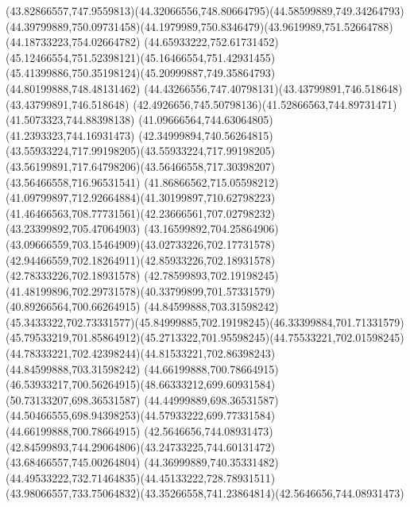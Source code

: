 {{\curveto(43.82866557,747.9559813)(44.32066556,748.80664795)(44.58599889,749.34264793)
\curveto(44.39799889,750.09731458)(44.1979989,750.8346479)(43.9619989,751.52664788)
\lineto(44.18733223,754.02664782)
\curveto(44.65933222,752.61731452)(45.12466554,751.52398121)(45.16466554,751.42931455)
\curveto(45.41399886,750.35198124)(45.20999887,749.35864793)(44.80199888,748.48131462)
\curveto(44.43266556,747.40798131)(43.43799891,746.518648)(43.43799891,746.518648)
\curveto(42.4926656,745.50798136)(41.52866563,744.89731471)(41.5073323,744.88398138)
\lineto(41.09666564,744.63064805)
\lineto(41.2393323,744.16931473)
\curveto(42.34999894,740.56264815)(43.55933224,717.99198205)(43.55933224,717.99198205)
\curveto(43.56199891,717.64798206)(43.56466558,717.30398207)(43.56466558,716.96531541)
\curveto(41.86866562,715.05598212)(41.09799897,712.92664884)(41.30199897,710.62798223)
\curveto(41.46466563,708.77731561)(42.23666561,707.02798232)(43.23399892,705.47064903)
\curveto(43.16599892,704.25864906)(43.09666559,703.15464909)(43.02733226,702.17731578)
\curveto(42.94466559,702.18264911)(42.85933226,702.18931578)(42.78333226,702.18931578)
\lineto(42.78599893,702.19198245)
\curveto(41.48199896,702.29731578)(40.33799899,701.57331579)(40.89266564,700.66264915)
\moveto(44.84599888,703.31598242)
\curveto(45.3433322,702.73331577)(45.84999885,702.19198245)(46.33399884,701.71331579)
\curveto(45.79533219,701.85864912)(45.2713322,701.95598245)(44.75533221,702.01598245)
\curveto(44.78333221,702.42398244)(44.81533221,702.86398243)(44.84599888,703.31598242)
\moveto(44.66199888,700.78664915)
\curveto(46.53933217,700.56264915)(48.66333212,699.60931584)(50.73133207,698.36531587)
\lineto(44.44999889,698.36531587)
\curveto(44.50466555,698.94398253)(44.57933222,699.77331584)(44.66199888,700.78664915)
\moveto(42.5646656,744.08931473)
\curveto(42.84599893,744.29064806)(43.24733225,744.60131472)(43.68466557,745.00264804)
\curveto(44.36999889,740.35331482)(44.49533222,732.71464835)(44.45133222,728.78931511)
\curveto(43.98066557,733.75064832)(43.35266558,741.23864814)(42.5646656,744.08931473)
}
}

{
}

